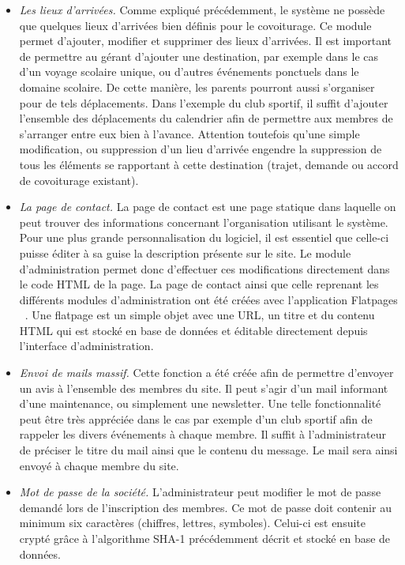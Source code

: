 \documentclass[12pt, a4paper, oneside]{article}
\begin{document}
{{\begin{itemize}
        \item \textit{Les lieux d'arrivées.} Comme expliqué précédemment, le système ne possède que quelques lieux d'arrivées bien définis pour le covoiturage. Ce module permet d'ajouter, modifier et supprimer des lieux d'arrivées. Il est important de permettre au gérant d'ajouter une destination, par exemple dans le cas d'un voyage scolaire unique, ou d'autres événements ponctuels dans le domaine scolaire. De cette manière, les parents pourront aussi s'organiser pour de tels déplacements. Dans l'exemple du club sportif, il suffit d'ajouter l'ensemble des déplacements du calendrier afin de permettre aux membres de s'arranger entre eux bien à l'avance. Attention toutefois qu'une simple modification, ou suppression d'un lieu d'arrivée engendre la suppression de tous les éléments se rapportant à cette destination (trajet, demande ou accord de covoiturage existant).\\
        \item \textit{La page de contact.} La page de contact est une page statique dans laquelle on peut trouver des informations concernant l'organisation utilisant le système. Pour une plus grande personnalisation du logiciel, il est essentiel que celle-ci puisse éditer à sa guise la description présente sur le site. Le module d'administration permet donc d'effectuer ces modifications directement dans le code HTML de la page. La page de contact ainsi que celle reprenant les différents modules d'administration ont été créées avec l'application Flatpages ~\cite{django-flatpage}. Une flatpage est un simple objet avec une URL, un titre et du contenu HTML qui est stocké en base de données et éditable directement depuis l'interface d'administration.\\
        \item \textit{Envoi de mails massif.} Cette fonction a été créée afin de permettre d'envoyer un avis à l'ensemble des membres du site. Il peut s'agir d'un mail informant d'une maintenance, ou simplement une newsletter. Une telle fonctionnalité peut être très appréciée dans le cas par exemple d'un club sportif afin de rappeler les divers événements à chaque membre. Il suffit à l'administrateur de préciser le titre du mail ainsi que le contenu du message. Le mail sera ainsi envoyé à chaque membre du site.\\
        \item \textit{Mot de passe de la société.} L'administrateur peut modifier le mot de passe demandé lors de l'inscription des membres. Ce mot de passe doit contenir au minimum six caractères (chiffres, lettres, symboles). Celui-ci est ensuite crypté grâce à l'algorithme  SHA-1 précédemment décrit et stocké en base de données.\\

\end{itemize}}}
\end{document}
